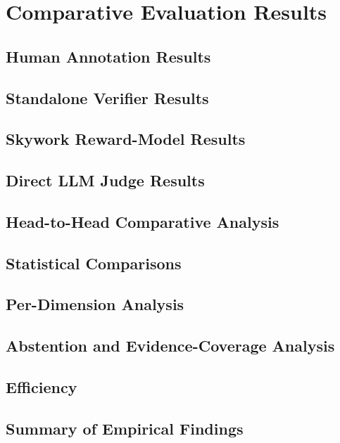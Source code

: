 \chapter{Comparative Evaluation Results}
\label{ch:results}
\section{Human Annotation Results}
\mbox{}\par
\section{Standalone Verifier Results}
\mbox{}\par
\section{Skywork Reward-Model Results}
\mbox{}\par
\section{Direct LLM Judge Results}
\mbox{}\par
\section{Head-to-Head Comparative Analysis}

\section{Statistical Comparisons}
\mbox{}\par
\section{Per-Dimension Analysis}
\mbox{}\par
\section{Abstention and Evidence-Coverage Analysis}
\mbox{}\par
\section{Efficiency}
\mbox{}\par
\section{Summary of Empirical Findings}
\mbox{}\par
